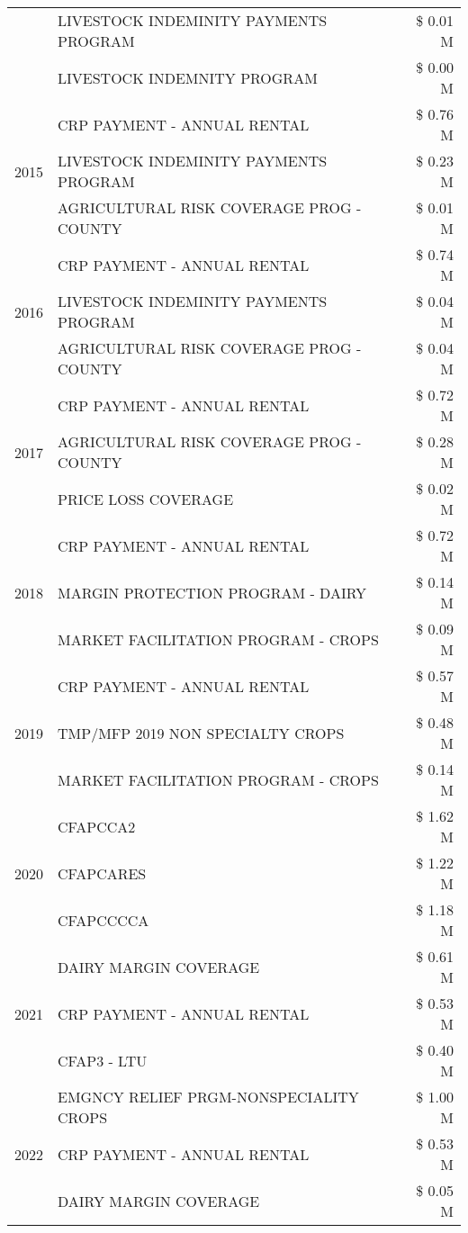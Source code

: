 \begin{tabular}{llr}
 & LIVESTOCK INDEMINITY PAYMENTS PROGRAM & \$ 0.01 M \\
 & LIVESTOCK INDEMNITY PROGRAM & \$ 0.00 M \\
\cline{1-3}
\multirow[t]{3}{*}{2015} & CRP PAYMENT - ANNUAL RENTAL & \$ 0.76 M \\
 & LIVESTOCK INDEMINITY PAYMENTS PROGRAM & \$ 0.23 M \\
 & AGRICULTURAL RISK COVERAGE PROG - COUNTY & \$ 0.01 M \\
\cline{1-3}
\multirow[t]{3}{*}{2016} & CRP PAYMENT - ANNUAL RENTAL & \$ 0.74 M \\
 & LIVESTOCK INDEMINITY PAYMENTS PROGRAM & \$ 0.04 M \\
 & AGRICULTURAL RISK COVERAGE PROG - COUNTY & \$ 0.04 M \\
\cline{1-3}
\multirow[t]{3}{*}{2017} & CRP PAYMENT - ANNUAL RENTAL & \$ 0.72 M \\
 & AGRICULTURAL RISK COVERAGE PROG - COUNTY & \$ 0.28 M \\
 & PRICE LOSS COVERAGE & \$ 0.02 M \\
\cline{1-3}
\multirow[t]{3}{*}{2018} & CRP PAYMENT - ANNUAL RENTAL & \$ 0.72 M \\
 & MARGIN PROTECTION PROGRAM - DAIRY & \$ 0.14 M \\
 & MARKET FACILITATION PROGRAM - CROPS & \$ 0.09 M \\
\cline{1-3}
\multirow[t]{3}{*}{2019} & CRP PAYMENT - ANNUAL RENTAL & \$ 0.57 M \\
 & TMP/MFP 2019 NON SPECIALTY CROPS & \$ 0.48 M \\
 & MARKET FACILITATION PROGRAM - CROPS & \$ 0.14 M \\
\cline{1-3}
\multirow[t]{3}{*}{2020} & CFAPCCA2 & \$ 1.62 M \\
 & CFAPCARES & \$ 1.22 M \\
 & CFAPCCCCA & \$ 1.18 M \\
\cline{1-3}
\multirow[t]{3}{*}{2021} & DAIRY MARGIN COVERAGE & \$ 0.61 M \\
 & CRP PAYMENT - ANNUAL RENTAL & \$ 0.53 M \\
 & CFAP3 - LTU & \$ 0.40 M \\
\cline{1-3}
\multirow[t]{3}{*}{2022} & EMGNCY RELIEF PRGM-NONSPECIALITY CROPS & \$ 1.00 M \\
 & CRP PAYMENT - ANNUAL RENTAL & \$ 0.53 M \\
 & DAIRY MARGIN COVERAGE & \$ 0.05 M \\
\cline{1-3}
\bottomrule
\end{tabular}
